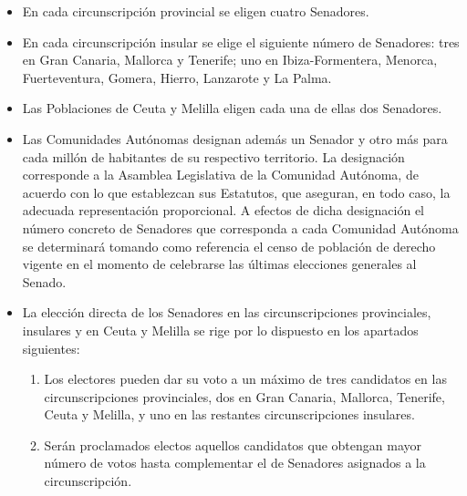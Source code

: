 \documentclass[12pt,a4paper,]{book}
\def\ifdoblecara{} %
\def\ifprincipal{} %
\numberwithin{dummy}{section}
\theoremstyle{ocrenumbox}
\theoremstyle{blacknumex}
\theoremstyle{blacknumbox}
\theoremstyle{ocrenum}
\theoremstyle{ocrenum}
\begin{document}
\begin{itemize}
\item
  En cada circunscripción provincial se eligen cuatro Senadores.
\item
  En cada circunscripción insular se elige el siguiente número de
  Senadores: tres en Gran Canaria, Mallorca y Tenerife; uno en
  Ibiza-Formentera, Menorca, Fuerteventura, Gomera, Hierro, Lanzarote y
  La Palma.
\item
  Las Poblaciones de Ceuta y Melilla eligen cada una de ellas dos
  Senadores.
\item
  Las Comunidades Autónomas designan además un Senador y otro más para
  cada millón de habitantes de su respectivo territorio. La designación
  corresponde a la Asamblea Legislativa de la Comunidad Autónoma, de
  acuerdo con lo que establezcan sus Estatutos, que aseguran, en todo
  caso, la adecuada representación proporcional. A efectos de dicha
  designación el número concreto de Senadores que corresponda a cada
  Comunidad Autónoma se determinará tomando como referencia el censo de
  población de derecho vigente en el momento de celebrarse las últimas
  elecciones generales al Senado.
\item
  La elección directa de los Senadores en las circunscripciones
  provinciales, insulares y en Ceuta y Melilla se rige por lo dispuesto
  en los apartados siguientes:

  \begin{enumerate}
  \def\labelenumi{\alph{enumi})}
  \item
    Los electores pueden dar su voto a un máximo de tres candidatos en
    las circunscripciones provinciales, dos en Gran Canaria, Mallorca,
    Tenerife, Ceuta y Melilla, y uno en las restantes circunscripciones
    insulares.
  \item
    Serán proclamados electos aquellos candidatos que obtengan mayor
    número de votos hasta complementar el de Senadores asignados a la
    circunscripción.
  \end{enumerate}
\end{itemize}

\FloatBarrier

\ifdefined\ifprincipal
\else
\setlength{\parindent}{1em}
\pagestyle{fancy}
\setcounter{tocdepth}{4}
\tableofcontents

\fi

\ifdefined\ifdoblecara
\fancyhead{}{}
\fancyhead[LE,RO]{\scriptsize\rightmark}
\fancyfoot[LO,RE]{\scriptsize\slshape \leftmark}
\fancyfoot[C]{}
\fancyfoot[LE,RO]{\footnotesize\thepage}
\else
\fancyhead{}{}
\fancyhead[RO]{\scriptsize\rightmark}
\fancyfoot[LO]{\scriptsize\slshape \leftmark}
\fancyfoot[C]{}
\fancyfoot[RO]{\footnotesize\thepage}
\fi
\renewcommand{\headrulewidth}{0.4pt}
\renewcommand{\footrulewidth}{0.4pt}
\end{document}
